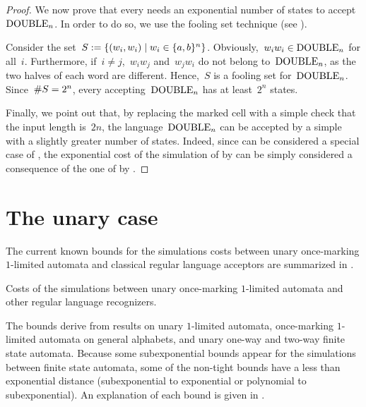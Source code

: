 \begin{proof}
	We now prove that every \ONFA needs an exponential number of states to accept~$\mathrm{DOUBLE}_n$.
	In order to do so, we use the fooling set technique (see ).

	Consider the set~$S:=\{(w_i,w_i)\mid w_i\in\{a,b\}^n\}$.
	Obviously,~$w_iw_i\in\mathrm{DOUBLE}_n$ for all~$i$.
	Furthermore, if~$i\ne j$,~$w_iw_j$ and~$w_jw_i$ do not belong to~$\mathrm{DOUBLE}_n$, as the two halves of each word are different.
	Hence,~$S$ is a fooling set for~$\mathrm{DOUBLE}_n$.
	Since~$\# S=2^n$, every \ONFA accepting~$\mathrm{DOUBLE}_n$ has at least~$2^n$ states.

	Finally, we point out that, by replacing the marked cell with a simple check that the input length is~$2n$, the language~$\mathrm{DOUBLE}_n$ can be accepted by a simple \TDFA with a slightly greater number of states.
	Indeed, since \TDFAs can be considered a special case of \OMODLAs, the exponential cost of the simulation of \OMODLAs by \ONFAs can be simply considered a consequence of the one of \TDFAs by \ONFAs.
\end{proof}



\section{The unary case}\label{sec:oncemarking-unary}
The current known bounds for the simulations costs between unary once-marking $1$-limited automata and classical regular language acceptors are summarized in .

\begin{table}
	\caption{Costs of the simulations between unary once-marking $1$-limited automata and other regular language recognizers.}
	\label{tab:sims-om-unary-oncemarking}
\end{table}

The bounds derive from results on unary $1$-limited automata, once-marking $1$-limited automata on general alphabets, and unary one-way and two-way finite state automata.
Because some subexponential bounds appear for the simulations between finite state automata, some of the non-tight bounds have a less than exponential distance (subexponential to exponential or polynomial to subexponential).
An explanation of each bound is given in .

